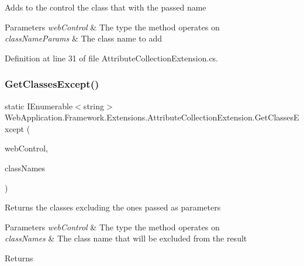 Adds to the control the class that with the passed name 


\begin{DoxyParams}{Parameters}
{\em web\+Control} & The type the method operates on\\
\hline
{\em class\+Name\+Params} & The class name to add\\
\hline
\end{DoxyParams}


Definition at line 31 of file Attribute\+Collection\+Extension.\+cs.

\mbox{\label{classWebApplication_1_1Framework_1_1Extensions_1_1AttributeCollectionExtension_affd7f518f210175330b6665f31a8ae5d}} 
\subsubsection{\texorpdfstring{GetClassesExcept()}{GetClassesExcept()}}
{\footnotesize\ttfamily static I\+Enumerable$<$string$>$ Web\+Application.\+Framework.\+Extensions.\+Attribute\+Collection\+Extension.\+Get\+Classes\+Except (\begin{DoxyParamCaption}\item[{this Web\+Control}]{web\+Control,  }\item[{I\+Enumerable$<$ string $>$}]{class\+Names }\end{DoxyParamCaption})\hspace{0.3cm}{\ttfamily [static]}}



Returns the classes excluding the ones passed as parameters 


\begin{DoxyParams}{Parameters}
{\em web\+Control} & The type the method operates on\\
\hline
{\em class\+Names} & The class name that will be excluded from the result\\
\hline
\end{DoxyParams}
\begin{DoxyReturn}{Returns}

\end{DoxyReturn}


